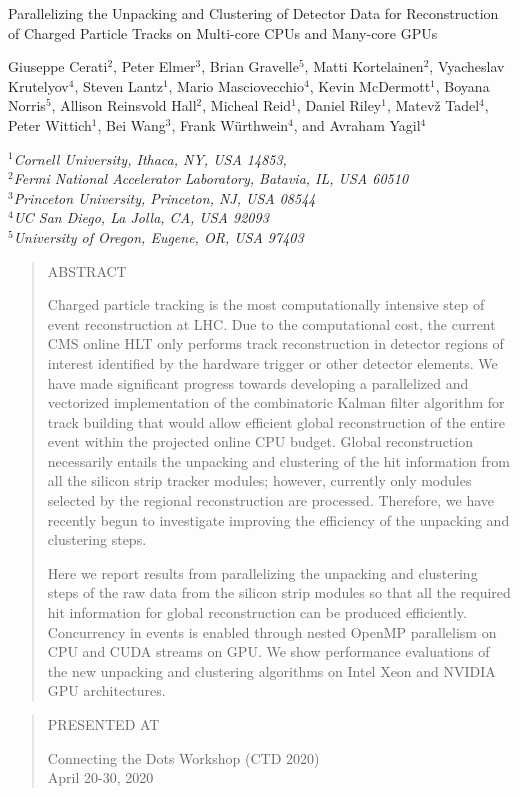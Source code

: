 \documentclass[10pt, paper=a4, UKenglish]{article}
\def\Title#1{\begin{center} {\Large #1 } \end{center}}
\def\Author#1{\begin{center}{ \sc #1} \end{center}}
\def\Address#1{\begin{center}{ \it #1} \end{center}}
\newcommand\pubblock{\rightline{\begin{tabular}{l} Proceedings of CTD 2020\\ \pubnumber\\
         \pubdate  \end{tabular}}}
\newenvironment{Abstract}{\begin{quotation} \begin{center} 
             \large ABSTRACT \end{center}\bigskip 
   \begin{center}\begin{large}}{\end{large}\end{center}\end{quotation}}
\newenvironment{Presented}{\begin{quotation} \begin{center} 
             PRESENTED AT\end{center}\bigskip 
      \begin{center}\begin{large}}{\end{large}\end{center} \end{quotation}}
\newcommand\pubnumber{PROC-CTD2020-XX}
\newcommand\pubdate{\today}
\def\affiliation{
$^1$Cornell University, Ithaca, NY, USA 14853, \\
$^2$Fermi National Accelerator Laboratory, Batavia, IL, USA 60510\\
$^3$Princeton University, Princeton, NJ, USA 08544 \\
$^4$UC San Diego, La Jolla, CA, USA 92093 \\
$^5$University of Oregon, Eugene, OR, USA 97403
}
\def\support{\footnote{Work supported by  XYZ Foundation}}
\newcommand{\conference}{Connecting the Dots Workshop (CTD 2020)\\
April 20-30, 2020}
\begin{document}
\newcommand{\mkFit}{\textsc{mkFit}\xspace}


\large
\begin{titlepage}
\pubblock

\vfill
\Title{Parallelizing the Unpacking and Clustering of Detector Data for Reconstruction of Charged Particle Tracks on Multi-core CPUs and Many-core GPUs}
\vfill

\Author{Giuseppe Cerati$^{2}$, Peter Elmer$^{3}$, Brian Gravelle$^{5}$, Matti Kortelainen$^{2}$, 
Vyacheslav Krutelyov$^{4}$, Steven Lantz$^{1}$, Mario Masciovecchio$^{4}$, Kevin McDermott$^{1}$, Boyana Norris$^{5}$, Allison Reinsvold Hall$^{2}$, Micheal Reid$^{1}$, Daniel Riley$^{1}$, 
Matev\v{z} Tadel$^{4}$, Peter Wittich$^{1}$, Bei Wang$^{3}$, Frank W\"urthwein$^{4}$, and Avraham Yagil$^{4}$ }
\Address{\affiliation}
\vfill

\begin{Abstract}
Charged particle tracking is the most computationally intensive step of event reconstruction at LHC. Due to the computational cost, the current CMS online HLT only performs track reconstruction in detector regions of interest identified by the hardware trigger or other detector elements. We have made significant progress towards developing a parallelized and vectorized implementation of the combinatoric Kalman filter algorithm for track building that would allow efficient global reconstruction of the entire event within the projected online CPU budget. Global reconstruction necessarily entails the unpacking and clustering of the hit information from all the silicon strip tracker modules; however, currently only modules selected by the regional reconstruction are processed. Therefore, we have recently begun to investigate improving the efficiency of the unpacking and clustering steps.

Here we report results from parallelizing the unpacking and clustering steps of the raw data from the silicon strip modules so that all the required hit information for global reconstruction can be produced efficiently. Concurrency in events is enabled through nested OpenMP parallelism on CPU and CUDA streams on GPU. We show performance evaluations of the new unpacking and clustering algorithms on Intel Xeon and NVIDIA GPU architectures.
\end{Abstract}
\vfill

\begin{Presented}
\conference
\end{Presented}
\vfill
\end{titlepage}
\def\thefootnote{\fnsymbol{footnote}}
\setcounter{footnote}{0}
%
\end{document}
